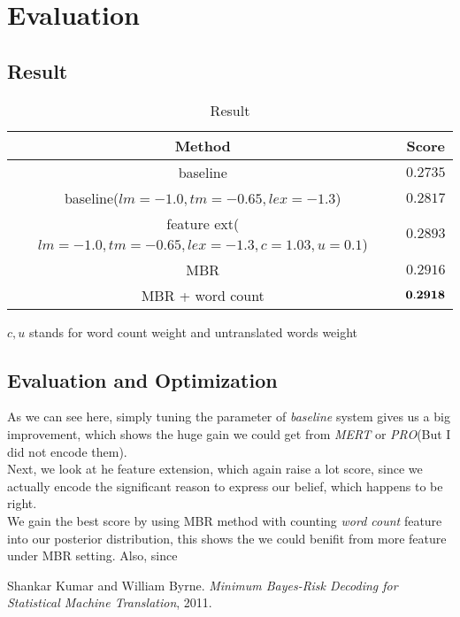 \documentclass[11pt]{article}
\begin{document}
\section{Evaluation} %
\label{sec:evaluation}
\subsection{Result} %
\label{sub:result}
\begin{table}[!htf]
\centering
\begin{tabular}{ | c | c |}
\hline
Method & Score\\
\hline
baseline & $0.2735$\\
\hline
baseline($lm = -1.0, tm = -0.65, lex = -1.3$) & $0.2817$ \\
\hline
feature ext($lm = -1.0, tm = -0.65, lex = -1.3, c = 1.03, u = 0.1$) & $0.2893$ \\
\hline
MBR & $0.2916$ \\
\hline
MBR + word count & $\bf{0.2918}$ \\
\hline
\end{tabular}
\caption{Result}
$c, u$ stands for word count weight and untranslated words weight 
\end{table}

\subsection{Evaluation and Optimization} %
\label{sub:evaluation_Optimization}
As we can see here, simply tuning the parameter of \textit{baseline} system gives us a big improvement, which shows the huge gain we could get from \textit{MERT} or \textit{PRO}(But I did not encode them).\\
Next, we look at he feature extension, which again raise a lot score, since we actually encode the significant reason to express our belief, which happens to be right.\\
We gain the best score by using MBR method with counting \textit{word count} feature into our posterior distribution, this shows the we could benifit from more feature under MBR setting. Also, since 

\begin{thebibliography}{50}
 Shankar Kumar and William Byrne. \textsl{Minimum Bayes-Risk Decoding for Statistical Machine Translation}, 2011.

\end{thebibliography}
\end{document}
